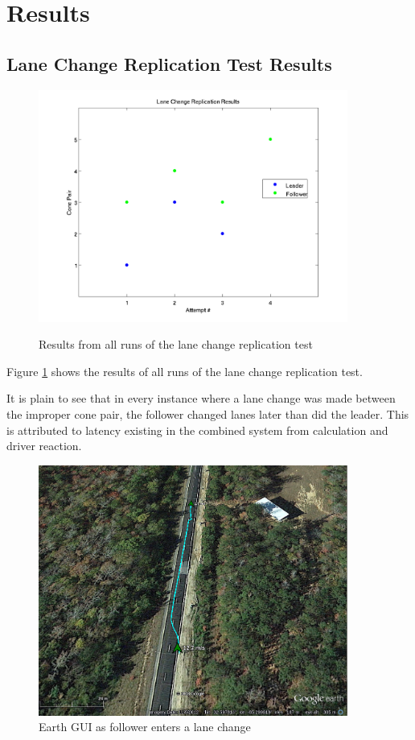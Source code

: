 \section{Results} \label{sec:results}

\subsection{Lane Change Replication Test Results} \label{sec:lanechangetestresults}

\begin{figure}[ht] \caption{Results from all runs of the lane change replication test} \centering \label{fig:lanechangeresults}
    \includegraphics[width=4in]{./figs/lane_change_results.png}
\end{figure}

Figure \ref{fig:lanechangeresults} shows the results of all runs of the lane change replication test.

It is plain to see that in every instance where a lane change was made between the improper cone pair, the follower changed lanes later than did the leader. This is attributed to latency existing in the combined system from calculation and driver reaction.

\begin{figure}[ht] \centering
    \includegraphics[width=4in]{./figs/lane_change.png}
    \caption{Earth GUI as follower enters a lane change} \label{fig:lanechange_earth}
\end{figure}


